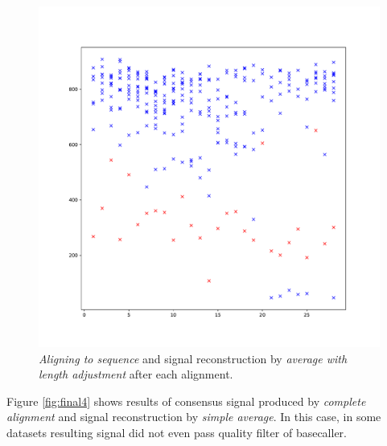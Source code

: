 \begin{figure}
  \centering
  \includegraphics[width=1.0\textwidth]{images/final6}
  \caption{\textit{Aligning to sequence} and signal reconstruction by \textit{average with length adjustment} after each alignment.}
  \label{fig:final6}
\end{figure}

Figure \ref{fig:final4} shows results of consensus signal produced by \textit{complete alignment} and 
signal reconstruction by \textit{simple average}. In this case, in some datasets resulting signal did not even pass 
quality filter of basecaller.

